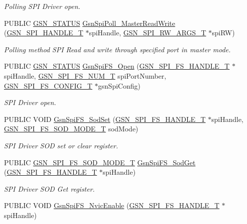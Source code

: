 \begin{DoxyCompactItemize}
\begin{DoxyCompactList}\small\item\em Polling SPI Driver open. \end{DoxyCompactList}\item 
PUBLIC \hyperlink{a00660_gada5951904ac6110b1fa95e51a9ddc217}{GSN\_\-STATUS} \hyperlink{a00655_ga92f3c7ce5633d6ae76f1d37062716676}{GsnSpiPoll\_\-MasterReadWrite} (\hyperlink{a00238}{GSN\_\-SPI\_\-HANDLE\_\-T} $\ast$spiHandle, \hyperlink{a00239}{GSN\_\-SPI\_\-RW\_\-ARGS\_\-T} $\ast$spiRW)
\begin{DoxyCompactList}\small\item\em Polling method SPI Read and write through specified port in master mode. \end{DoxyCompactList}\item 
PUBLIC \hyperlink{a00660_gada5951904ac6110b1fa95e51a9ddc217}{GSN\_\-STATUS} \hyperlink{a00655_ga08c9eaf99c6d82d2dc1ca82541705714}{GsnSpiFS\_\-Open} (\hyperlink{a00234}{GSN\_\-SPI\_\-FS\_\-HANDLE\_\-T} $\ast$spiHandle, \hyperlink{a00589_af1ec0abe9693a9ef0c69dc5696f322b3}{GSN\_\-SPI\_\-FS\_\-NUM\_\-T} spiPortNumber, \hyperlink{a00233}{GSN\_\-SPI\_\-FS\_\-CONFIG\_\-T} $\ast$gsnSpiConfig)
\begin{DoxyCompactList}\small\item\em SPI Driver open. \end{DoxyCompactList}\item 
PUBLIC VOID \hyperlink{a00655_ga89264f326bcee7b92fa19c8982741114}{GsnSpiFS\_\-SodSet} (\hyperlink{a00234}{GSN\_\-SPI\_\-FS\_\-HANDLE\_\-T} $\ast$spiHandle, \hyperlink{a00655_gaa0f62d38ee68880a4e3bb673a05d293d}{GSN\_\-SPI\_\-FS\_\-SOD\_\-MODE\_\-T} sodMode)
\begin{DoxyCompactList}\small\item\em SPI Driver SOD set or clear register. \end{DoxyCompactList}\item 
PUBLIC \hyperlink{a00655_gaa0f62d38ee68880a4e3bb673a05d293d}{GSN\_\-SPI\_\-FS\_\-SOD\_\-MODE\_\-T} \hyperlink{a00655_ga8f68d2d6a945c9e7237cdc0d215d5095}{GsnSpiFS\_\-SodGet} (\hyperlink{a00234}{GSN\_\-SPI\_\-FS\_\-HANDLE\_\-T} $\ast$spiHandle)
\begin{DoxyCompactList}\small\item\em SPI Driver SOD Get register. \end{DoxyCompactList}\item 
PUBLIC VOID \hyperlink{a00655_gaf9dc341501508d7843da0e06f776c1c2}{GsnSpiFS\_\-NvicEnable} (\hyperlink{a00234}{GSN\_\-SPI\_\-FS\_\-HANDLE\_\-T} $\ast$spiHandle)

\end{DoxyCompactItemize}
